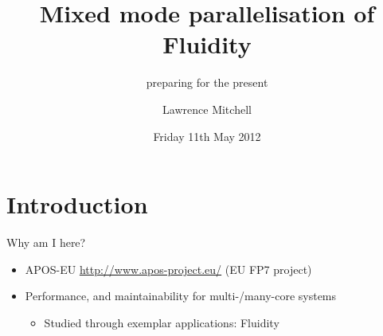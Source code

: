 \documentclass[bigger]{beamer}
\subtitle{preparing for the present}
\institute{EPCC, The University of Edinburgh}
\author{Lawrence Mitchell}
\date{Friday 11th May 2012}
\title{Mixed mode parallelisation of Fluidity}
\begin{document}
\begin{frame}
\maketitle
\end{frame}

\section{Introduction}
\label{sec:orgheadline5}

\begin{frame}[label={sec:orgheadline2}]{Why am I here?}
\begin{itemize}
\item APOS-EU \url{http://www.apos-project.eu/} (EU FP7 project)
\item Performance, and maintainability for multi-/many-core systems
\begin{itemize}
\item Studied through exemplar applications: Fluidity
\end{itemize}
\end{itemize}
\end{frame}
\end{document}
